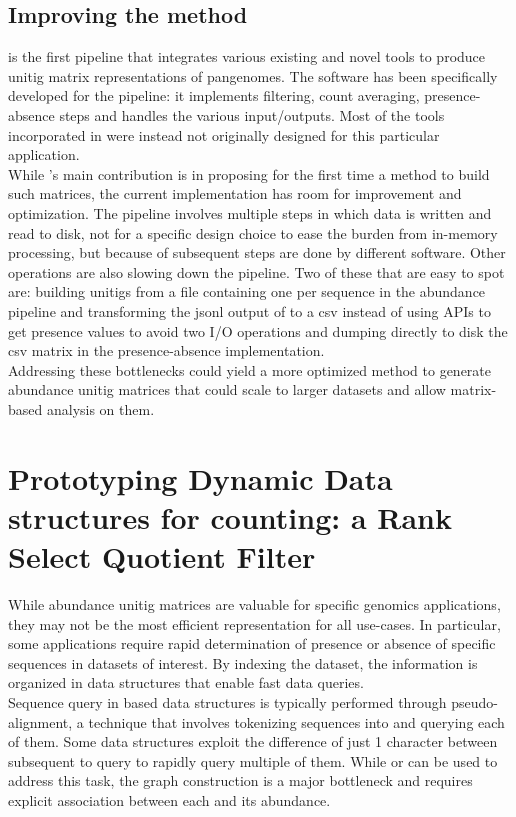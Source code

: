 \subsection{Improving the method}
\muset is the first pipeline that integrates various existing and novel tools to produce unitig matrix representations of pangenomes. The \kmat software has been specifically developed for the pipeline: it implements filtering, count averaging, presence-absence steps and handles the various input/outputs. Most of the tools incorporated in \muset were instead not originally designed for this particular application.\\
While \muset's main contribution is in proposing for the first time a method to build such matrices, the current implementation has room for improvement and optimization.
The pipeline involves multiple steps in which data is written and read to disk, not for a specific design choice to ease the burden from in-memory processing, but because of subsequent steps are done by different software. Other operations are also slowing down the pipeline. Two of these that are easy to spot are: building unitigs from a file containing one \kmer per sequence in the abundance pipeline and transforming the jsonl output of \ggcat to a csv instead of using \ggcat APIs to get presence values to avoid two I/O operations and dumping directly to disk the csv matrix in the presence-absence implementation.\\
Addressing these bottlenecks could yield a more optimized method to generate abundance unitig matrices that could scale to larger datasets and allow matrix-based analysis on them.

\section{Prototyping Dynamic Data structures for \kmer counting: a Rank Select Quotient Filter}
\label{sec:qf}
While abundance unitig matrices are valuable for specific genomics applications, they may not be the most efficient representation for all use-cases. In particular, some applications require rapid determination of presence or absence of specific sequences in datasets of interest. By indexing the dataset, the information is organized in data structures that enable fast data queries.\\
Sequence query in \kmer based data structures is typically performed through pseudo-alignment, a technique that involves tokenizing sequences into \kmers and querying each of them. Some data structures exploit the difference of just 1 character between subsequent \kmers to query to rapidly query multiple of them. While \cdbg or \ccdbg can be used to address this task, the graph construction is a major bottleneck and requires explicit association between each \kmer and its abundance. \\
